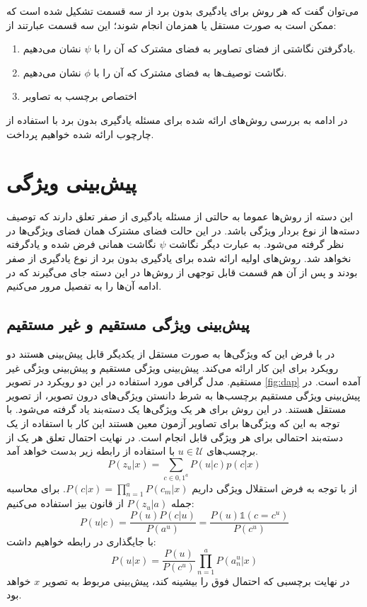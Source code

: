  می‌توان گفت که هر روش برای یادگیری بدون برد از سه قسمت تشکیل شده است که ممکن است به صورت مستقل یا همزمان انجام شوند؛ این سه قسمت عبارتند از:
\begin{enumerate}
  \item یادگرفتن نگاشتی از فضای تصاویر به فضای مشترک
  که آن را با $\psi$ نشان می‌دهیم.
  \item نگاشت توصیف‌ها به فضای مشترک
  که آن را با $\phi$ نشان می‌دهیم.
  \item اختصاص برچسب به تصاویر
\end{enumerate}
در ادامه به بررسی روش‌های ارائه شده برای مسئله یادگیری بدون برد با استفاده از چارچوب ارائه شده خواهیم پرداخت.
\section{پیش‌بینی ویژگی }
این دسته از روش‌ها عموما به حالتی از مسئله یادگیری از صفر تعلق دارند که توصیف دسته‌ها از نوع بردار ویژگی باشد. در این حالت فضای مشترک همان فضای ویژگی‌ها در نظر گرفته می‌شود. به عبارت دیگر نگاشت $\psi$ نگاشت همانی فرض شده و یادگرفته نخواهد شد. روش‌های اولیه ارائه شده برای یادگیری بدون برد از نوع یادگیری از صفر بودند و پس از آن‌ هم قسمت قابل توجهی از روش‌ها در این دسته جای می‌گیرند که در ادامه آن‌ها را به تفصیل مرور می‌کنیم.

\subsection{پیش‌بینی ویژگی مستقیم و غیر مستقیم}
در
\cite{lampert09}
با فرض این که ویژگی‌ها به صورت مستقل از یکدیگر قابل پیش‌بینی هستند دو رویکرد برای این کار ارائه می‌کند. پیش‌بینی ویژگی مستقیم و پیش‌بینی ویژگی غیر مستقیم. مدل گرافی مورد استفاده در این دو رویکرد در تصویر \ref{fig:dap} آمده است. در پیش‌بینی ویژگی مستقیم برچسب‌ها به شرط دانستن ویژگی‌های درون تصویر، از تصویر مستقل هستند. در این روش برای هر یک ویژگی‌ها یک دسته‌بند یاد گرفته می‌شود. با توجه به این که ویژگی‌ها برای تصاویر آزمون معین هستند این کار با استفاده از یک دسته‌بند احتمالی برای هر ویژگی قابل انجام است. در نهایت احتمال تعلق هر یک از برچسب‌های
$ u \in \mathcal{U} $
با استفاده از رابطه زیر بدست خواهد آمد.
\begin{equation}
  P(z_u | x ) = \sum_{c\in {0,1}^a} P(u | c) p(c|x)
\end{equation}
از با توجه به فرض استقلال ویژگی داریم
$P(c|x) = \prod_{n=1}^a P(c_m |x)$.
برای محاسبه جمله $P(z_u | a)$ از قانون بیز استفاده می‌کنیم:
\[
P(u | c) = \frac{P(u)P(c|u)}{P(a^{u})}  = \frac {P(u) \mathds{1}(c= c^{u})} {P(c^{u})}
\]
با جایگذاری در رابطه  خواهیم داشت:
\begin{equation}
  P(u | x ) = \frac{P(u)}{P(c^{u})} \prod_{n=1}^a P(a^{u}_n|x)
\end{equation}
در نهایت برچسبی که احتمال فوق را بیشینه کند، پیش‌بینی مربوط به تصویر $x$ خواهد بود.

